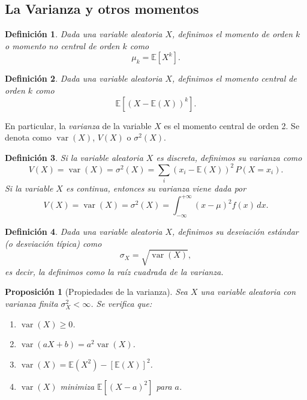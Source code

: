 \documentclass{report}
\newtheorem{prop}{Proposición}[section]
\newtheorem{dfn}{Definición}[section]
\begin{document}
\subsection{La Varianza y otros momentos}
\begin{dfn}
Dada una variable aleatoria \(X\), definimos el momento de orden \(k\) o \emph{momento no central de orden \(k\)} como
\[
\mu_k = \mathbb{E}[X^k].
\]
\end{dfn}

\begin{dfn}
Dada una variable aleatoria \(X\), definimos el \emph{momento central de orden \(k\)} como
\[
\mathbb{E}[(X - \mathbb{E}(X))^k].
\]
\end{dfn}

En particular, la \emph{varianza} de la variable \(X\) es el momento central de orden 2. Se denota como \( \operatorname{var}(X) \), \( V(X) \) o \( \sigma^2(X) \).

\begin{dfn}
Si la variable aleatoria \(X\) es \textit{discreta}, definimos su varianza como
\[
V(X) = \operatorname{var}(X) = \sigma^2(X) = \sum_i (x_i - \mathbb{E}(X))^2 \, P(X = x_i).
\]
Si la variable \(X\) es \textit{continua}, entonces su varianza viene dada por
\[
V(X) = \operatorname{var}(X) = \sigma^2(X) = \int_{-\infty}^{+\infty} (x - \mu)^2 f(x) \, dx.
\]
\end{dfn}

\begin{dfn}
Dada una variable aleatoria \(X\), definimos su \emph{desviación estándar} (o desviación típica) como
\[
\sigma_X = \sqrt{\operatorname{var}(X)},
\]
es decir, la definimos como la raíz cuadrada de la varianza.
\end{dfn}

\begin{prop}[Propiedades de la varianza]
Sea \( X \) una variable aleatoria con varianza finita \( \sigma_X^2 < \infty \). Se verifica que:

\begin{enumerate}
    \item \( \operatorname{var}(X) \geq 0 \).
    \item \( \operatorname{var}(aX + b) = a^2 \operatorname{var}(X) \).
    \item \( \operatorname{var}(X) = \mathbb{E}(X^2) - [\mathbb{E}(X)]^2 \).
    \item \( \operatorname{var}(X) \) minimiza \( \mathbb{E}[(X - a)^2] \) para $a$.
\end{enumerate}
\end{prop}
\end{document}
